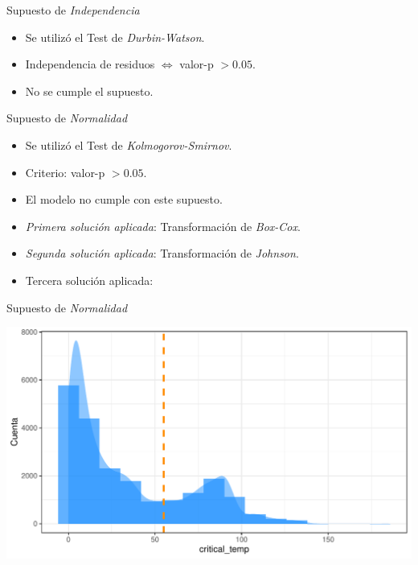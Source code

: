 \documentclass[11pt]{beamer}\usepackage{knitr}
\begin{document}
\begin{frame}{Supuesto de \textit{Independencia}}
	\begin{itemize}
		\item Se utilizó el Test de \textit{Durbin-Watson}.
		\pause
		\item Independencia de residuos $\Leftrightarrow$ valor-p $>\mathbf{0.05}$.
		\pause
		\item No se cumple el supuesto.
	\end{itemize}
\end{frame}

\begin{frame}{Supuesto de \textit{Normalidad}}
	\begin{itemize}
		\item Se utilizó el Test de \textit{Kolmogorov-Smirnov}.
		\pause
		\item Criterio: valor-p $>\mathbf{0.05}$.
		\pause
		\item El modelo no cumple con este supuesto.
		\pause
		\item \textit{Primera solución aplicada}: Transformación de \textit{Box-Cox}.
		\pause
		\item \textit{Segunda solución aplicada}: Transformación de \textit{Johnson}.
		\pause
		\item Tercera solución aplicada:
	\end{itemize}
\end{frame}

\begin{frame}[fragile]{Supuesto de \textit{Normalidad}}

\begin{knitrout}\footnotesize
{}\color{fgcolor}

{\centering \includegraphics[width=\maxwidth]{figure/unnamed-chunk-8-1} 

}



\end{knitrout}


\end{frame}
\end{document}
